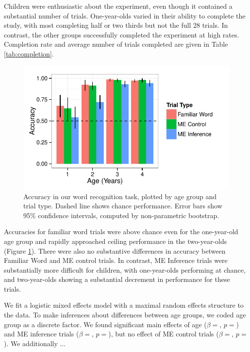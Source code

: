 \documentclass[man,noapacite]{apa2}
\begin{document}
Children were enthusiastic about the experiment, even though it contained a substantial number of trials. One-year-olds varied in their ability to complete the study, with most completing half or two thirds but not the full 28 trials. In contrast, the other groups successfully completed the experiment at high rates. Completion rate and average number of trials completed are given in Table \ref{tab:completion}.

\begin{figure}[t] 
  \begin{center} 
    \includegraphics[width=5in]{figures/accuracy.pdf} 
    \caption{\label{fig:accuracy} Accuracy in our word recognition task, plotted by age group and trial type. Dashed line shows chance performance. Error bars show 95\% confidence intervals, computed by non-parametric bootstrap. }
  \end{center} 
\end{figure}

Accuracies for familiar word trials were above chance even for the one-year-old age group and rapidly approached ceiling performance in the two-year-olds (Figure \ref{fig:accuracy}). There were also no substantive differences in accuracy between Familiar Word and ME control trials. In contrast, ME Inference trials were substantially more difficult for children, with one-year-olds performing at chance, and two-year-olds showing a substantial decrement in performance for these trials. 

We fit a logistic mixed effects model with a maximal random effects structure \cite{barr2013} to the data. To make inferences about differences between age groups, we coded age group as a discrete factor.  We found significant main effects of age ($\beta = $, $p = $) and ME inference trials ($\beta = $, $p = $), but no effect of ME control trials ($\beta = $, $p = $). We additionally ...
\end{document}
